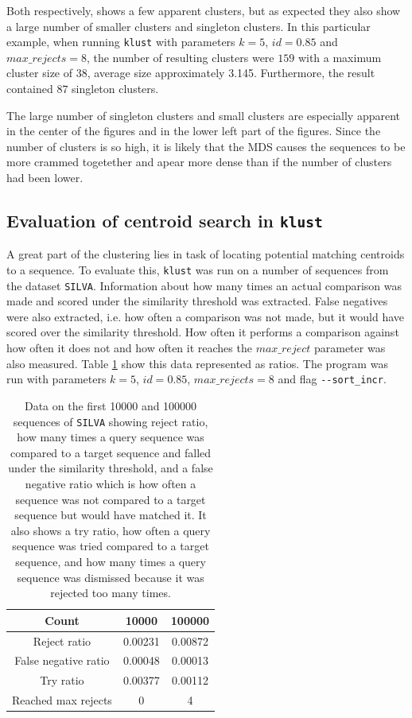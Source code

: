 Both respectively, shows a few apparent clusters, but as expected they also
show a large number of smaller clusters and singleton clusters. In this
particular example, when running \texttt{klust} with parameters $k=5$,
$id=0.85$ and $max\_rejects=8$, the number of resulting clusters were $159$ with
a maximum cluster size of $38$, average size approximately \num{3.145}.
Furthermore, the result contained $87$ singleton clusters.

The large number of singleton clusters and small clusters are especially
apparent in the center of the figures and in the lower left part of the
figures. Since the number of clusters is so high, it is likely that the MDS
causes the sequences to be more crammed togetether and apear more dense than
if the number of clusters had been lower.



\subsection{Evaluation of centroid search in \texttt{klust}}
\label{sec:evaluation_centroid_search}

A great part of the clustering lies in task of locating potential matching
centroids to a sequence. To evaluate this, \texttt{klust} was run on a number
of sequences from the dataset \texttt{SILVA}. Information about how many times
an actual comparison was made and scored under the similarity threshold was
extracted. False negatives were also extracted, i.e. how often a comparison
was not made, but it would have scored over the similarity threshold. How
often it performs a comparison against how often it does not and how often it
reaches the $max\_reject$ parameter was also measured. Table
\ref{tab:centroid_search_data} show this data represented as ratios. The
program was run with parameters $k=5$, $id=0.85$, $max\_rejects=8$ and flag
\texttt{-{}-sort\_incr}.

\begin{table}[H]
  \centering
  \begin{tabular}{c|c|c}
  Count                & \num{10000} & \num{100000} \\
  \hline\hline
  Reject ratio         & 0.00231  & 0.00872 \\
  \hline
  False negative ratio & 0.00048  & 0.00013 \\
  \hline
  Try ratio            & 0.00377  & 0.00112 \\
  \hline
  Reached max rejects  & 0           & 4 \\
  \end{tabular}
  \caption{Data on the first \num{10000} and \num{100000} sequences of 
  \texttt{SILVA} showing reject ratio, how many times a query sequence was 
  compared to a target sequence and falled under the similarity threshold, and 
  a false negative ratio which is how often a sequence was not compared to a 
  target sequence but would have matched it. It also shows a try ratio, how 
  often a query sequence was tried compared to a target sequence, and how many 
  times a query sequence was dismissed because it was rejected too many times.}
  \label{tab:centroid_search_data}
\end{table}

